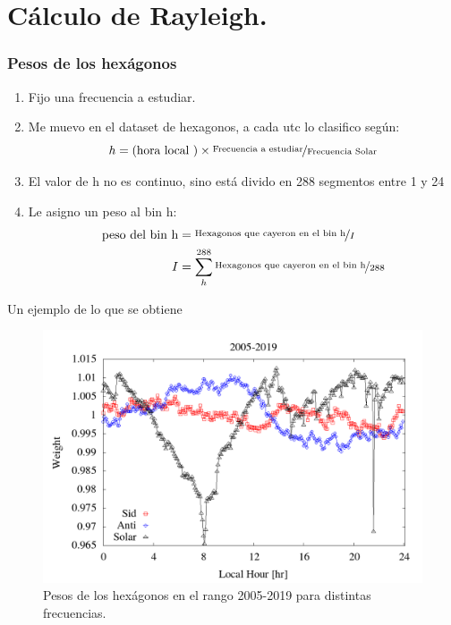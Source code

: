 \section{Cálculo de Rayleigh.}

  \subsubsection{Pesos de los hexágonos}

      \begin{enumerate}
        \item Fijo una frecuencia a estudiar.
        \item Me muevo en el dataset de hexagonos, a cada utc lo clasifico según:
        \begin{equation*}
          h = (\text{hora local })\times \nicefrac{\text{Frecuencia a estudiar}}{\text{Frecuencia Solar}}
        \end{equation*}
          \item El valor de h no es continuo, sino está divido en 288 segmentos entre 1 y 24
       \item Le asigno un peso al bin h:
        \begin{align*}
          \text{peso del bin h} &= \nicefrac{\text{Hexagonos que cayeron en el bin h}}{I}\\
          I &= \sum^{288}_h \nicefrac{\text{Hexagonos que cayeron en el bin h}}{288}
         \end{align*} 
      \end{enumerate}

      Un ejemplo de lo que se obtiene


        \begin{figure}[H]
          \centering
              \includegraphics[width=0.85\linewidth]{../report_2_27_04_2020/Graficos/weigth2005-2019.png}
              \caption{Pesos de los hexágonos en el rango 2005-2019 para distintas frecuencias.}
        \end{figure}

